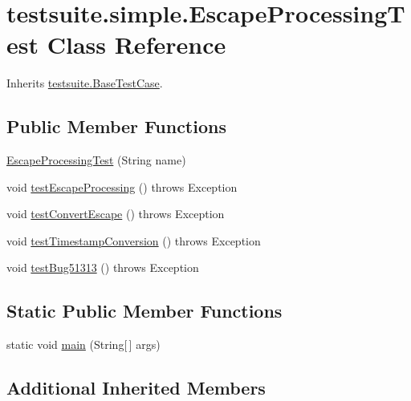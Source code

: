\hypertarget{classtestsuite_1_1simple_1_1_escape_processing_test}{}\section{testsuite.\+simple.\+Escape\+Processing\+Test Class Reference}
\label{classtestsuite_1_1simple_1_1_escape_processing_test}


Inherits \mbox{\hyperlink{classtestsuite_1_1_base_test_case}{testsuite.\+Base\+Test\+Case}}.

\subsection*{Public Member Functions}
\begin{DoxyCompactItemize}
\item 
\mbox{\hyperlink{classtestsuite_1_1simple_1_1_escape_processing_test_a81d83c09c29ce9529a293d56e6097efe}{Escape\+Processing\+Test}} (String name)
\item 
void \mbox{\hyperlink{classtestsuite_1_1simple_1_1_escape_processing_test_a89dd9212c87f06506d7442cafd9ce935}{test\+Escape\+Processing}} ()  throws Exception 
\item 
void \mbox{\hyperlink{classtestsuite_1_1simple_1_1_escape_processing_test_a72337dad91eb44391ac9f34d7531b177}{test\+Convert\+Escape}} ()  throws Exception 
\item 
void \mbox{\hyperlink{classtestsuite_1_1simple_1_1_escape_processing_test_aaf3f62a0f5fc6b6d808edba7f20361c3}{test\+Timestamp\+Conversion}} ()  throws Exception 
\item 
void \mbox{\hyperlink{classtestsuite_1_1simple_1_1_escape_processing_test_a06117e478b5255ff186b2a98f7b08b50}{test\+Bug51313}} ()  throws Exception 
\end{DoxyCompactItemize}
\subsection*{Static Public Member Functions}
\begin{DoxyCompactItemize}
\item 
static void \mbox{\hyperlink{classtestsuite_1_1simple_1_1_escape_processing_test_acf0bde8d1c2ad44b686c7200a26a80ff}{main}} (String\mbox{[}$\,$\mbox{]} args)
\end{DoxyCompactItemize}
\subsection*{Additional Inherited Members}


